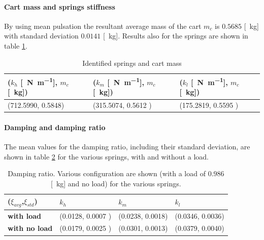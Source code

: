 \paragraph{Cart mass and springs stiffness}
By using   mean pulsation the resultant average mass of the cart $m_c$ is $0.5685$ [\SI{}{\kilo\gram}] with standard deviation $  0.0141$ [\SI{}{\kilo \gram}]. Results also for the springs are shown in table \ref{table:cart_springs_mass}.
\begin{table}[!h]
\centering
\begin{tabular}{|l|l|l|}
\hline
{\textbf{($k_h$ [\SI{}{\newton \per \metre}], $m_c$ [\SI{}{\kilo \gram}])}} & \textbf{($k_m$ [\SI{}{\newton \per \metre}], $m_c$ [\SI{}{\kilo \gram}])} & \textbf{($k_l$ [\SI{}{\newton \per \metre}], $m_c$ [\SI{}{\kilo \gram}])} \\ \hline
(712.5990, 0.5848)              & (315.5074, 0.5612 )     & (175.2819, 0.5595 )     \\ \hline
\end{tabular}

\caption{Identified springs and cart mass}
\label{table:cart_springs_mass}
\end{table}

\paragraph{Damping and damping ratio}
The mean values for the damping ratio, including their standard deviation, are shown in table \ref{table:cart_detached_dampingratio} for the various springs, with and without a load.
\begin{table}[!h]
\centering


\begin{tabular}{|l|l|l|l|}
\hline
{(\textbf{$\xi_{avg}$},$\xi_{std}$)} & \textbf{$k_h$} & \textbf{$k_m$}   & \textbf{$k_l$}   \\ \hline
\textbf{with load}         & (0.0128,  0.0007 )    & (0.0238, 0.0018) & (0.0346, 0.0036) \\ \hline
\textbf{with no load}      & (0.0179, 0.0025 )    & (0.0301, 0.0013) & (0.0379, 0.0040)      \\ \hline
\end{tabular}

\caption{Damping ratio. Various configuration are shown (with a load of $0.986$ [\SI{}{\kilo \gram}] and no load) for the various springs. }
\label{table:cart_detached_dampingratio}
\end{table}


